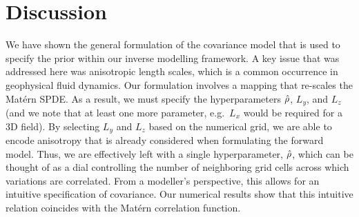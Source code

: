 \section{Discussion}
\label{sec:matern_discussion}

We have shown the general formulation of the covariance model that is used
to specify the prior within our inverse modelling framework.
A key issue that was addressed here was anisotropic length scales, which is a
common occurrence in geophysical fluid dynamics.
Our formulation involves a mapping that re-scales the Mat\'ern SPDE.
As a result, we must specify the hyperparameters $\hat{\rho}$, $L_y$, and $L_z$
(and we note that at least one more parameter, e.g.\ $L_x$ would be required for
a 3D field).
By selecting $L_y$ and $L_z$ based on the numerical grid, we are able to encode
anisotropy that is already considered when formulating the forward model.
Thus, we are effectively left with a single hyperparameter, $\hat{\rho}$, which can
be thought of as a dial controlling the number of neighboring grid cells across
which variations are correlated.
From a modeller's perspective, this allows for an intuitive specification of
covariance.
Our numerical results show that this intuitive relation coincides with the
Mat\'ern correlation function. \\

